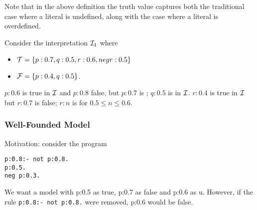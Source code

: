 
Note that in the above definition the truth value \ourU{} captures
both the traditional case where a literal is undefined, along with the
case where a literal is overdefined.

\begin{example} 
  Consider the interpretation $\cI_1$ where
\begin{itemize}
\item  $\cT = \{p:0.7,q:0.5, r:0.6,\ourneg r:0.5\}$
\item $\cF = \{p:0.4, q:0.5\}$.
\end{itemize}
$p:0.6$ is true in $\cI$ and $p:0.8$ false, but $p:0.7$ is \ourU ;
$q:0.5$ is \ourU{} in $\cI$. $r:0.4$ is true in $\cI$ but $r:0.7$ is
false; $r:n$ is \ourU{} for $0.5 \leq n \leq 0.6$.
\end{example}



\subsubsection{Well-Founded Model}

Motivation: consider the program
\begin{verbatim}
p:0.8:- not p:0.8.
p:0.5.
neg p:0.3.
\end{verbatim}
We want a model with p:0.5 as true, p:0.7 as false and p:0.6 as u.
However, if the rule {\tt p:0.8:- not p:0.8.} were removed, p:0.6
would be false.

